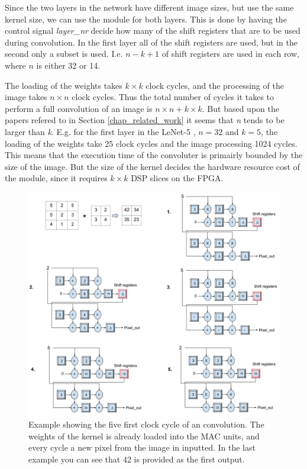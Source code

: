 Since the two layers in the network have different image sizes, but use the same kernel size, we can use the module for both layers. This is done by having the control signal \textit{layer\_nr} decide how many of the shift registers that are to be used during convolution. In the first layer all of the shift registers are used, but in the second only a subset is used. I.e. $ n-k+1 $ of shift registers are used in each row, where $ n $ is either 32 or 14. 

The loading of the weights takes $ k \times k $ clock cycles, and the processing of the image takes $ n \times n $ clock cycles. Thus the total number of cycles it takes to perform a full convolution of an image is $ n \times n + k \times k $. But based upon the papers refered to in Section \ref{chap_related_work} it seems that \textit{n} tends to be larger than \textit{k}. E.g. for the first layer in the LeNet-5 \cite{LeCun1998}, $ n = 32 $ and $ k = 5 $, the loading  of the weights take 25 clock cycles and the image processing 1024 cycles. This means that the execution time of the convoluter is primairly bounded by the size of the image. But the size of the kernel decides the hardware resource cost of the module, since it requires $ k \times k $ DSP slices on the FPGA.

\begin{figure}[h!]
  \centering
      \includegraphics[width=1.1\textwidth]{Figures/Method/Conv_example}
  \caption[Convolution example]{Example showing the five first clock cycle of an convolution. The weights of the kernel is already loaded into the MAC units, and every cycle a new pixel from the image in inputted. In the last example you can see that 42 is provided as the first output.}
\end{figure}

